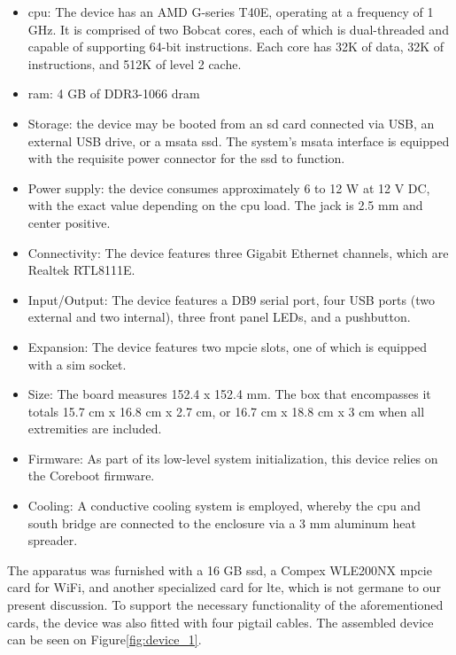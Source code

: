 \begin{itemize}
    \item \gls{cpu}: The device has an AMD G-series T40E, operating at a frequency of 1 GHz. It is comprised of two Bobcat cores, each of which is dual-threaded and capable of supporting 64-bit instructions. Each core has 32K of data, 32K of instructions, and 512K of level 2 cache.
    \item \gls{ram}: 4 GB of DDR3-1066 \gls{dram}
    \item Storage: the device may be booted from an \gls{sd} card connected via USB, an external USB drive, or a \gls{msata} \gls{ssd}. The system's \gls{msata} interface is equipped with the requisite power connector for the \gls{ssd} to function.
    \item Power supply: the device consumes approximately 6 to 12 W at 12 V DC, with the exact value depending on the \gls{cpu} load. The jack is 2.5 mm and center positive.
    \item Connectivity: The device features three Gigabit Ethernet channels, which are Realtek RTL8111E.
    \item Input/Output: The device features a DB9 serial port, four USB ports (two external and two internal), three front panel LEDs, and a pushbutton.
    \item Expansion: The device features two \gls{mpcie} slots, one of which is equipped with a \gls{sim} socket. 
    \item Size: The board measures 152.4 x 152.4 mm. The box that encompasses it totals 15.7 cm x 16.8 cm x 2.7 cm, or 16.7 cm x 18.8 cm x 3 cm when all extremities are included.
    \item Firmware: As part of its low-level system initialization, this device relies on the Coreboot firmware.
    \item Cooling: A conductive cooling system is employed, whereby the \gls{cpu} and south bridge are connected to the enclosure via a 3 mm aluminum heat spreader.
\end{itemize}


The apparatus was furnished with a 16 GB \gls{ssd}, a Compex WLE200NX \gls{mpcie} card for WiFi, and another specialized card for \gls{lte}, which is not germane to our present discussion. To support the necessary functionality of the aforementioned cards, the device was also fitted with four pigtail cables. The assembled device can be seen on Figure\ref{fig:device_1}.

